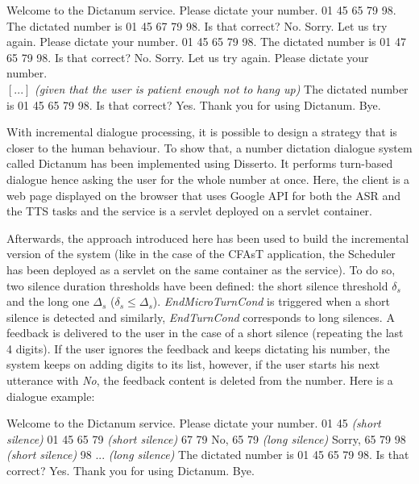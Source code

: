         \begin{dialogue}
        	 Welcome to the Dictanum service. Please dictate your number.
             01 45 65 79 98.
             The dictated number is 01 45 67 79 98. Is that correct?
             No.
             Sorry. Let us try again. Please dictate your number.
             01 45 65 79 98.
             The dictated number is 01 47 65 79 98. Is that correct?
             No.
             Sorry. Let us try again. Please dictate your number. \\
            $\left[...\right]$ \textit{(given that the user is patient enough not to hang up)}
             The dictated number is 01 45 65 79 98. Is that correct?
             Yes.
             Thank you for using Dictanum. Bye.
        \end{dialogue}
        
        With incremental dialogue processing, it is possible to design a strategy that is closer to the human behaviour. To show that, a number dictation dialogue system called Dictanum has been implemented using Disserto. It performs turn-based dialogue hence asking the user for the whole number at once. Here, the client is a web page displayed on the browser that uses Google API for both the ASR and the TTS tasks and the service is a servlet deployed on a servlet container.
        
        Afterwards, the approach introduced here has been used to build the incremental version of the system (like in the case of the CFAsT application, the Scheduler has been deployed as a servlet on the same container as the service). To do so, two silence duration thresholds have been defined: the short silence threshold $\delta_s$ and the long one $\Delta_s$ ($\delta_s \leq \Delta_s$). \textit{EndMicroTurnCond} is triggered when a short silence is detected and similarly, \textit{EndTurnCond} corresponds to long silences. A feedback is delivered to the user in the case of a short silence (repeating the last 4 digits). If the user ignores the feedback and keeps dictating his number, the system keeps on adding digits to its list, however, if the user starts his next utterance with \textit{No}, the feedback content is deleted from the number. Here is a dialogue example:
        
        \begin{dialogue}
       	     Welcome to the Dictanum service. Please dictate your number.
             01 45 \textit{(short silence)}
             01 45
             65 79 \textit{(short silence)}
             67 79
             No, 65 79 \textit{(long silence)}
             Sorry, 65 79
             98 \textit{(short silence)}
             98
             ... \textit{(long silence)}
             The dictated number is 01 45 65 79 98. Is that correct?
             Yes.
             Thank you for using Dictanum. Bye.
        \end{dialogue}

